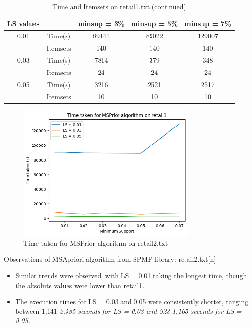\documentclass[12pt]{article}
\begin{document}
\begin{table}[h]
    \centering
    \begin{tabular}{ |c|c|c|c|c| }
        \hline
        \textbf{LS values} & & \textbf{minsup = 3\%} & \textbf{minsup = 5\%} & \textbf{minsup = 7\%} \\
        \hline
        \hline
        0.01 & Time(s) & 89441 & 89022 & 129007  \\
        & Itemsets & 140 & 140 & 140 \\
        \hline
        0.03 & Time(s) & 7814 & 379 & 348 \\
        & Itemsets & 24 & 24 & 24 \\
        \hline
        0.05 & Time(s) & 3216 & 2521 & 2517 \\
        & Itemsets & 10 & 10 & 10 \\
        \hline
        \end{tabular}
    \caption{Time and Itemsets on retail1.txt (continued)}
\end{table}

\begin{figure}[h] %
    \centering
    \includegraphics[width=0.8\textwidth]{4a.png}
    \caption{Time taken for MSPrior algorithm on retail2.txt}
\end{figure}

\clearpage

Observations of MSApriori algorithm from SPMF library: retail2.txt[h]
\begin{itemize}
    \item Similar trends were observed, with LS = 0.01 taking the longest time, though the absolute values were lower than retail1.
    \item The execution times for LS = 0.03 and 0.05 were consistently shorter, ranging between 1,141 \em 2,585 seconds for LS = 0.03 and 923 \em 1,165 seconds for LS = 0.05.
\end{itemize}
\end{document}
